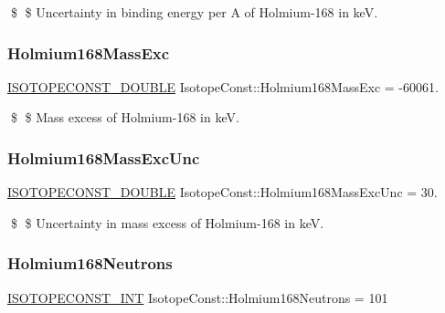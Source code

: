 \$ \$ Uncertainty in binding energy per A of Holmium-\/168 in keV. \mbox{\label{group___isotope_const-_holmium-_ho168_gadc45ff266477784b605f34c47a7569f3}} 
\subsubsection{\texorpdfstring{Holmium168\+Mass\+Exc}{Holmium168MassExc}}
{\footnotesize\ttfamily \mbox{\hyperlink{group___isotope_const-_macros_ga8f45a7272ce02c0b4c65c44636ed719a}{I\+S\+O\+T\+O\+P\+E\+C\+O\+N\+S\+T\+\_\+\+D\+O\+U\+B\+LE}} Isotope\+Const\+::\+Holmium168\+Mass\+Exc = -\/60061.}

\$ \$ Mass excess of Holmium-\/168 in keV. \mbox{\label{group___isotope_const-_holmium-_ho168_gab7263921a38f1b83c8bf6988da8b828b}} 
\subsubsection{\texorpdfstring{Holmium168\+Mass\+Exc\+Unc}{Holmium168MassExcUnc}}
{\footnotesize\ttfamily \mbox{\hyperlink{group___isotope_const-_macros_ga8f45a7272ce02c0b4c65c44636ed719a}{I\+S\+O\+T\+O\+P\+E\+C\+O\+N\+S\+T\+\_\+\+D\+O\+U\+B\+LE}} Isotope\+Const\+::\+Holmium168\+Mass\+Exc\+Unc = 30.}

\$ \$ Uncertainty in mass excess of Holmium-\/168 in keV. \mbox{\label{group___isotope_const-_holmium-_ho168_gab83a236d472f21be256b81b8475ede4f}} 
\subsubsection{\texorpdfstring{Holmium168\+Neutrons}{Holmium168Neutrons}}
{\footnotesize\ttfamily \mbox{\hyperlink{group___isotope_const-_macros_ga5f18360b3e99483a35c32d789e62621c}{I\+S\+O\+T\+O\+P\+E\+C\+O\+N\+S\+T\+\_\+\+I\+NT}} Isotope\+Const\+::\+Holmium168\+Neutrons = 101}

